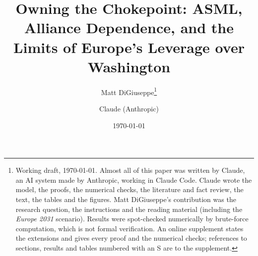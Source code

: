 \documentclass[11pt]{article}
\title{Owning the Chokepoint: ASML, Alliance Dependence, and the Limits of Europe's Leverage over Washington}
\author{}
\author{Matt DiGiuseppe\thanks{Working draft, \today. Almost all of this paper was written by Claude, an AI system made by Anthropic, working in Claude Code. Claude wrote the model, the proofs, the numerical checks, the literature and fact review, the text, the tables and the figures. Matt DiGiuseppe's contribution was the research question, the instructions and the reading material (including the \emph{Europe 2031} scenario). Results were spot-checked numerically by brute-force computation, which is not formal verification. An online supplement states the extensions and gives every proof and the numerical checks; references to sections, results and tables numbered with an S are to the supplement.} \and Claude (Anthropic)}
\date{\today}
\begin{document}
\maketitle

\begin{abstract}
\noindent 
\end{abstract}

\newpage









{\raggedright


}
\end{document}
